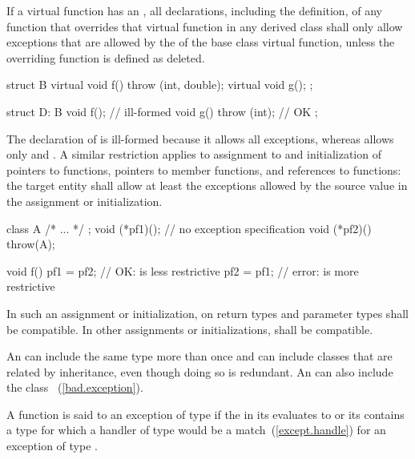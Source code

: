 \pnum
{}%
If a virtual function has an
,
all declarations, including the definition, of any function
that overrides that virtual function in any derived class
shall only allow exceptions that are allowed by the
of the base class virtual function,
unless the overriding function is defined as deleted.
\enterexample
\begin{codeblock}
struct B {
  virtual void f() throw (int, double);
  virtual void g();
};

struct D: B {
  void f();                     // ill-formed
  void g() throw (int);         // OK
};
\end{codeblock}

The declaration of
is ill-formed because it allows all exceptions, whereas
allows only
and
.
\exitexample
A similar restriction applies to assignment to and
initialization of pointers to functions, pointers
to member functions, and references to functions:
the target entity shall allow at least the exceptions
allowed by the source value in the assignment or
initialization.
\enterexample
\begin{codeblock}
class A { /* ... */ };
void (*pf1)();      // no exception specification
void (*pf2)() throw(A);

void f() {
  pf1 = pf2;        // OK:  is less restrictive
  pf2 = pf1;        // error:  is more restrictive
}
\end{codeblock}
\exitexample

\pnum
In such an assignment or initialization,
on return types and parameter types shall be compatible.
In other assignments or initializations,
shall be compatible.

\pnum
An
can include the same type more than once
and can include classes that are related by inheritance,
even though doing so is redundant.
\enternote An
can also include the class
~(\ref{bad.exception}).
\exitnote

\pnum
{}%
%
A function is said to
an exception of type
if
the  in its 
evaluates to  or
its
contains a type
for which a handler of type
would be a match~(\ref{except.handle}) for an exception of type
.

